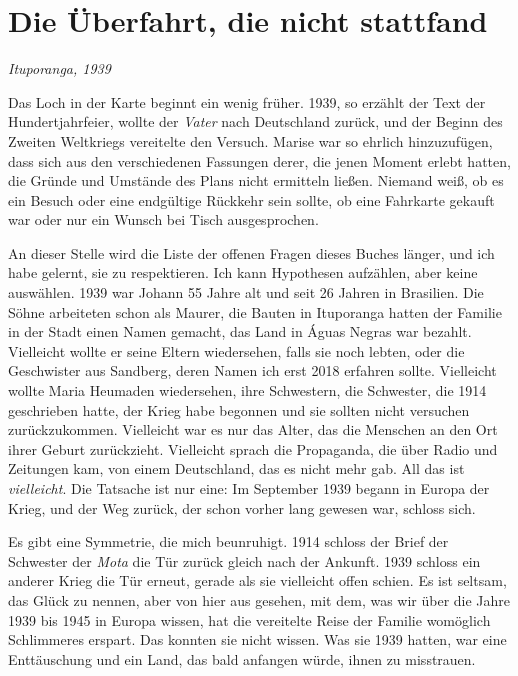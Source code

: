 \documentclass[
  ngerman,
  11pt,
  openany]{book}
\begin{document}
\section{Die Überfahrt, die nicht
stattfand}\label{die-uxfcberfahrt-die-nicht-stattfand}

\emph{Ituporanga, 1939}

Das Loch in der Karte beginnt ein wenig früher. 1939, so erzählt der
Text der Hundertjahrfeier, wollte der \emph{Vater} nach Deutschland
zurück, und der Beginn des Zweiten Weltkriegs vereitelte den Versuch.
Marise war so ehrlich hinzuzufügen, dass sich aus den verschiedenen
Fassungen derer, die jenen Moment erlebt hatten, die Gründe und Umstände
des Plans nicht ermitteln ließen. Niemand weiß, ob es ein Besuch oder
eine endgültige Rückkehr sein sollte, ob eine Fahrkarte gekauft war oder
nur ein Wunsch bei Tisch ausgesprochen.

An dieser Stelle wird die Liste der offenen Fragen dieses Buches länger,
und ich habe gelernt, sie zu respektieren. Ich kann Hypothesen
aufzählen, aber keine auswählen. 1939 war Johann 55 Jahre alt und seit
26 Jahren in Brasilien. Die Söhne arbeiteten schon als Maurer, die
Bauten in Ituporanga hatten der Familie in der Stadt einen Namen
gemacht, das Land in Águas Negras war bezahlt. Vielleicht wollte er
seine Eltern wiedersehen, falls sie noch lebten, oder die Geschwister
aus Sandberg, deren Namen ich erst 2018 erfahren sollte. Vielleicht
wollte Maria Heumaden wiedersehen, ihre Schwestern, die Schwester, die
1914 geschrieben hatte, der Krieg habe begonnen und sie sollten nicht
versuchen zurückzukommen. Vielleicht war es nur das Alter, das die
Menschen an den Ort ihrer Geburt zurückzieht. Vielleicht sprach die
Propaganda, die über Radio und Zeitungen kam, von einem Deutschland, das
es nicht mehr gab. All das ist \emph{vielleicht}. Die Tatsache ist nur
eine: Im September 1939 begann in Europa der Krieg, und der Weg zurück,
der schon vorher lang gewesen war, schloss sich.

Es gibt eine Symmetrie, die mich beunruhigt. 1914 schloss der Brief der
Schwester der \emph{Mota} die Tür zurück gleich nach der Ankunft. 1939
schloss ein anderer Krieg die Tür erneut, gerade als sie vielleicht
offen schien. Es ist seltsam, das Glück zu nennen, aber von hier aus
gesehen, mit dem, was wir über die Jahre 1939 bis 1945 in Europa wissen,
hat die vereitelte Reise der Familie womöglich Schlimmeres erspart. Das
konnten sie nicht wissen. Was sie 1939 hatten, war eine Enttäuschung und
ein Land, das bald anfangen würde, ihnen zu misstrauen.
\end{document}
